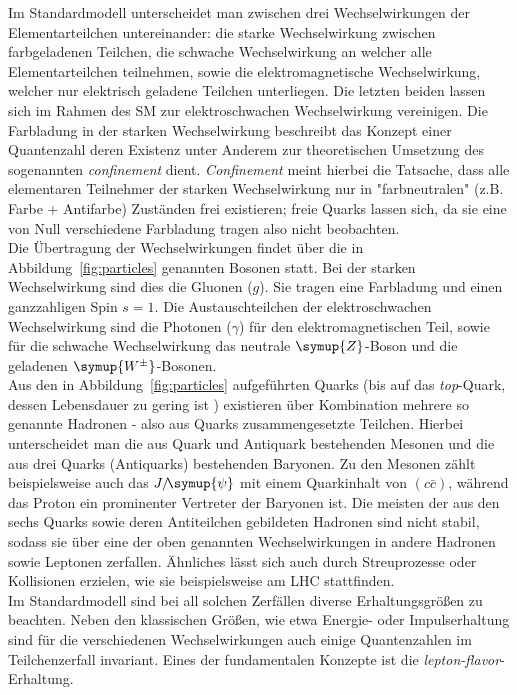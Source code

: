 Im Standardmodell unterscheidet man zwischen drei Wechselwirkungen der Elementarteilchen untereinander: die starke Wechselwirkung zwischen farbgeladenen Teilchen, die schwache Wechselwirkung an welcher alle Elementarteilchen teilnehmen, sowie die elektromagnetische Wechselwirkung, welcher nur elektrisch geladene Teilchen unterliegen. Die letzten beiden lassen sich im Rahmen des SM zur elektroschwachen Wechselwirkung vereinigen.
Die Farbladung in der starken Wechselwirkung beschreibt das Konzept einer Quantenzahl deren Existenz unter Anderem zur theoretischen Umsetzung des sogenannten \textit{confinement} dient. \textit{Confinement} meint hierbei die Tatsache, dass alle elementaren Teilnehmer der starken Wechselwirkung nur in "farbneutralen" (z.B. Farbe + Antifarbe) Zuständen frei existieren; freie Quarks lassen sich, da sie eine von Null verschiedene Farbladung tragen also nicht beobachten.\\
%
Die Übertragung der Wechselwirkungen findet über die in Abbildung~\ref{fig:particles} genannten Bosonen statt. Bei der starken Wechselwirkung sind dies die Gluonen ($g$). Sie tragen eine Farbladung und einen ganzzahligen Spin $s=1$. Die Austauschteilchen der elektroschwachen Wechselwirkung sind die Photonen ($\gamma$) für den elektromagnetischen Teil, sowie für die schwache Wechselwirkung das neutrale $\symup{Z}$-Boson und die geladenen $\symup{W^{\pm}}$-Bosonen. \\
%
Aus den in Abbildung~\ref{fig:particles} aufgeführten Quarks (bis auf das \textit{top}-Quark, dessen Lebensdauer zu gering ist \cite{pdg}) existieren über Kombination mehrere so genannte Hadronen - also aus Quarks zusammengesetzte Teilchen. Hierbei unterscheidet man die aus Quark und Antiquark bestehenden Mesonen und die aus drei Quarks (Antiquarks) bestehenden Baryonen. Zu den Mesonen zählt beispielsweise auch das $J/\!\symup{\psi}$ mit einem Quarkinhalt von $(c\bar{c})$, während das Proton ein prominenter Vertreter der Baryonen ist. Die meisten der aus den sechs Quarks sowie deren Antiteilchen gebildeten Hadronen sind nicht stabil, sodass sie über eine der oben genannten Wechselwirkungen in andere Hadronen sowie Leptonen zerfallen. Ähnliches lässt sich auch durch Streuprozesse oder Kollisionen erzielen, wie sie beispielsweise am LHC stattfinden.\\
%
Im Standardmodell sind bei all solchen Zerfällen diverse Erhaltungsgrößen zu beachten. Neben den klassischen Größen, wie etwa Energie- oder Impulserhaltung sind für die verschiedenen Wechselwirkungen auch einige Quantenzahlen im Teilchenzerfall invariant. Eines der fundamentalen Konzepte ist die \textit{lepton-flavor}-Erhaltung.
%
